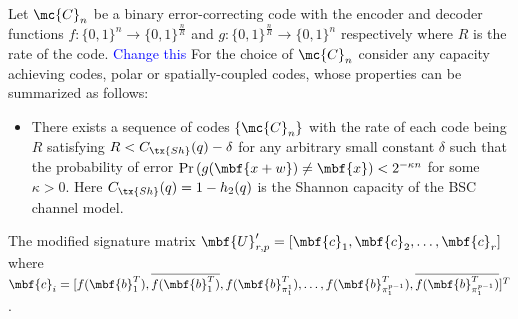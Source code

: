 \documentclass[conference,twocolumn]{IEEEtran}
\begin{document}
Let $\mc{C}_n$ be a binary error-correcting code with the encoder and decoder functions $f:\{0,1\}^{n}\rightarrow \{0,1\}^{\frac{n}{R}}$ and $g:\{0,1\}^{\frac{n}{R}}\rightarrow \{0,1\}^{n}$ respectively where $R$ is the rate of the code.
\textcolor{blue}{ Change this} For the choice of $\mc{C}_n$ consider any capacity achieving codes, polar or spatially-coupled codes, whose properties can be summarized as follows:
\begin{itemize}
\item There exists a sequence of codes $\{\mc{C}_n\}$ with the rate of each code being $R$ satisfying $R< C_{\tx{Sh}}(q)-\delta$ for any arbitrary small constant $\delta$ such that the probability of error $\text{Pr}\left(g(\mbf{x+w})\neq \mbf{x}\right)<2^{-\kappa n}$ for some $\kappa >0$. Here $C_{\tx{Sh}}(q)=1-h_2(q)$ is the Shannon capacity of the BSC channel model.
\end{itemize}
The modified signature matrix $\mbf{U}'_{r,p}=[\mbf{c}_1,\mbf{c}_2,\ldots,\mbf{c}_r]$ where $\mbf{c}_i=[f(\mbf{b}^T_1),\overline{f(\mbf{b}^T_1)},f(\mbf{b}^T_{\pi^{1}_{1}}),\ldots,f(\mbf{b}^T_{\pi^{p-1}_{1}}),\overline{f(\mbf{b}^T_{\pi^{p-1}_{1}})}]^T$ .
\end{document}
